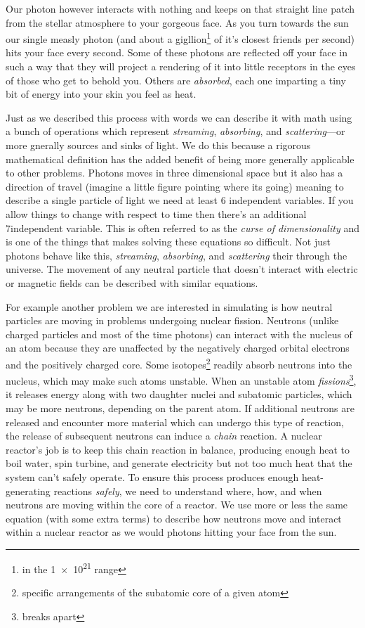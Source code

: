Our photon however interacts with nothing and keeps on that straight line patch from the stellar atmosphere to your gorgeous face.
As you turn towards the sun our single measly photon (and about a gigllion\footnote{in the \num{1e21} range} of it's closest friends per second) hits your face every second.
Some of these photons are reflected off your face in such a way that they will project a rendering of it into little receptors in the eyes of those who get to behold you.
Others are \textit{absorbed}, each one imparting a tiny bit of energy into your skin you feel as heat.

Just as we described this process with words we can describe it with math using a bunch of operations which represent \textit{streaming}, \textit{absorbing}, and \textit{scattering}---or more gnerally sources and sinks of light.
We do this because a rigorous mathematical definition has the added benefit of being more generally applicable to other problems.
Photons moves in three dimensional space but it also has a direction of travel (imagine a little figure pointing where its going) meaning to describe a single particle of light we need at least 6 independent variables.
If you allow things to change with respect to time then there's an additional 7\ths independent variable.
This is often referred to as the \textit{curse of dimensionality} and is one of the things that makes solving these equations so difficult.
Not just photons behave like this, \textit{streaming}, \textit{absorbing}, and \textit{scattering} their through the universe.
The movement of any neutral particle that doesn't interact with electric or magnetic fields can be described with similar equations.

For example another problem we are interested in simulating is how neutral particles are moving in problems undergoing nuclear fission.
Neutrons (unlike charged particles and most of the time photons) can interact with the nucleus of an atom because they are unaffected by the negatively charged orbital electrons and the positively charged core.
Some isotopes\footnote{specific arrangements of the subatomic core of a given atom} readily absorb neutrons into the nucleus, which may make such atoms unstable.
When an unstable atom \textit{fissions}\footnote{breaks apart}, it releases energy along with two daughter nuclei and subatomic particles, which may be more neutrons, depending on the parent atom.
If additional neutrons are released and encounter more material which can undergo this type of reaction, the release of subsequent neutrons can induce a \textit{chain} reaction.
A nuclear reactor's job is to keep this chain reaction in balance, producing enough heat to boil water, spin turbine, and generate electricity but not too much heat that the system can't safely operate.
To ensure this process produces enough heat-generating reactions \textit{safely}, we need to understand where, how, and when neutrons are moving within the core of a reactor.
We use more or less the same equation (with some extra terms) to describe how neutrons move and interact within a nuclear reactor as we would photons hitting your face from the sun.


